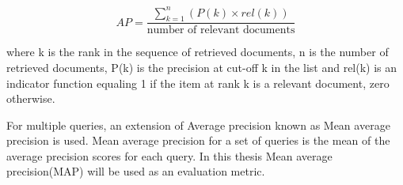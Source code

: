 \documentclass[12pt,a4paper] {article}
\begin{document}
\begin{equation}
AP =\frac {\sum_{k=1}^{n}(P(k)\times rel (k))}{\mbox {number of relevant documents}}
\end{equation}

where k is the rank in the sequence of retrieved documents,  n is the number of retrieved documents,  P(k) is the precision at cut-off k in the list and rel(k) is an indicator function equaling 1 if the item at rank k is a relevant document, zero otherwise.

For multiple queries, an extension of Average precision known as Mean average precision is used. Mean average precision for a set of queries is the mean of the average precision scores for each query. In this thesis Mean average precision(MAP) will be used as an evaluation metric.


 
\end{document}
